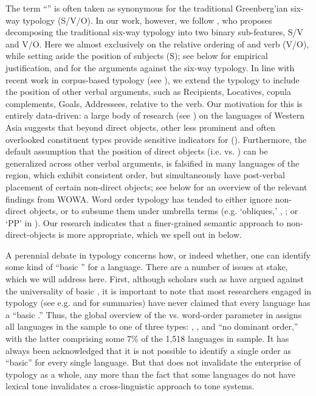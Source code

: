 \documentclass[output=paper,colorlinks,citecolor=brown,collectionchapter]{langscibook}
\begin{document}
The term ``'' is often taken as synonymous for the traditional Greenberg'ian six-way typology (S/V/O). In our work, however, we follow \citet{dryer_six-way_1997,dryer_against_2013}, who proposes decomposing the traditional six-way typology into two binary sub-features, S/V and V/O. Here we  almost exclusively on the relative ordering of  and verb (V/O), while setting aside the position of subjects (S); see below for empirical justification, and \citet{dryer_six-way_1997,dryer_against_2013} for the arguments against the six-way typology. In line with recent work in corpus-based typology (see ), we extend the typology to include the position of other verbal arguments, such as Recipients, Locatives, copula complements, Goals, Addressees, relative to the verb. Our motivation for this is entirely data-driven: a large body of research (see ) on the languages of Western Asia suggests that beyond direct objects, other less prominent and often overlooked constituent types provide sensitive indicators for  (\citealt{haig_which_2023}). Furthermore, the default assumption that the position of direct objects (i.e.  vs. ) can be generalized across other verbal arguments, is falsified in many languages of the region, which exhibit consistent  order, but simultaneously have post-verbal placement of certain non-direct objects; see  below for an overview of the relevant findings from WOWA. Word order typology has tended to either ignore non-direct objects, or to subsume them under umbrella terms (e.g. `obliques,' \citealt{hawkins_asymmetry_2008}, \citealt{levshina_token-based_2019,jing_word_2021}; or `PP' in \citealt{frommer_post-verbal_1981}). Our research indicates that a finer-grained semantic approach to non-direct-objects is more appropriate, which we spell out in  below.

A perennial debate in  typology concerns how, or indeed whether, one can identify some kind of ``basic '' for a language. There are a number of issues at stake, which we will address here. First, although scholars such as \citet{mithun1992basic} have argued against the universality of basic , it is important to note that most researchers engaged in  typology (see e.g. \citealt{dryer_word_2007} and \citealt{song2018linguistic} for summaries) have never claimed that every language has a ``basic .'' Thus, the global overview of the  vs.  word-order parameter in \citep{dryer_order_2013_OV} assigns all languages in the sample to one of three types: , , and ``no dominant order,'' with the latter comprising some 7\% of the 1,518 languages in  sample. It has always been acknowledged that it is not possible to identify a single order as ``basic'' for every single language. But that does not invalidate the enterprise of  typology as a whole, any more than the fact that some languages do not have lexical tone invalidates a cross-linguistic approach to tone systems. 
\end{document}
